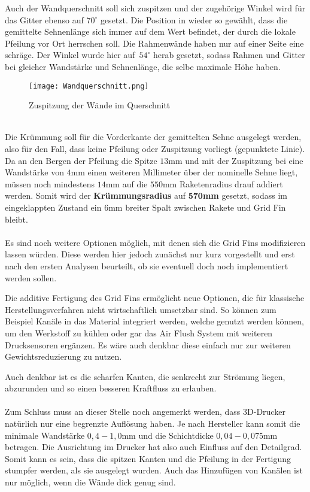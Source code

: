 Auch der Wandquerschnitt soll sich zuspitzen und der zugehörige Winkel wird für das Gitter ebenso auf $70^\circ$ gesetzt. Die Position in wieder so gewählt, dass die gemittelte Sehnenlänge sich immer auf dem Wert befindet, der durch die lokale Pfeilung vor Ort herrschen soll. Die Rahmenwände haben nur auf einer Seite eine schräge. Der Winkel wurde hier auf\ $54^\circ$ herab gesetzt, sodass Rahmen und Gitter bei gleicher Wandstärke und Sehnenlänge, die selbe maximale Höhe haben.
\begin{figure}
	\centering
	\texttt{[image: Wandquerschnitt.png]}
	\caption{Zuspitzung der Wände im Querschnitt}
\end{figure}\\
Die Krümmung soll für die Vorderkante der gemittelten Sehne ausgelegt werden, also für den Fall, dass keine Pfeilung oder Zuspitzung vorliegt (gepunktete Linie). Da an den Bergen der Pfeilung die Spitze $13$mm und mit der Zuspitzung bei eine Wandstärke von $4$mm einen weiteren Millimeter über der nominelle Sehne liegt, müssen noch mindestens $14$mm auf die $550$mm Raketenradius drauf addiert werden. Somit wird der \textbf{Krümmungsradius} auf $\mathbf{570}$\textbf{mm} gesetzt, sodass im eingeklappten Zustand ein $6$mm breiter Spalt zwischen Rakete und Grid Fin bleibt.
\\~\\
Es sind noch weitere Optionen möglich, mit denen sich die Grid Fins modifizieren lassen würden. Diese werden hier jedoch zunächst nur kurz vorgestellt und erst nach den ersten Analysen beurteilt, ob sie eventuell doch noch implementiert werden sollen.

Die additive Fertigung des Grid Fins ermöglicht neue Optionen, die für klassische Herstellungsverfahren nicht wirtschaftlich umsetzbar sind. So können zum Beispiel Kanäle in das Material integriert werden, welche genutzt werden können, um den Werkstoff zu kühlen oder gar das Air Flush System mit weiteren Drucksensoren ergänzen. Es wäre auch denkbar diese einfach nur zur weiteren Gewichtsreduzierung zu nutzen.

Auch denkbar ist es die scharfen Kanten, die senkrecht zur Strömung liegen, abzurunden und so einen besseren Kraftfluss zu erlauben.
\\~\\
Zum Schluss muss an dieser Stelle noch angemerkt werden, dass 3D-Drucker natürlich nur eine begrenzte Auflösung haben. Je nach Hersteller kann somit die minimale Wandstärke $0,4-1,0$mm \cite{eos, preise} und die Schichtdicke $0,04-0,075$mm \cite{preise} betragen. Die Ausrichtung im Drucker hat also auch Einfluss auf den Detailgrad. Somit kann es sein, dass die spitzen Kanten und die Pfeilung in der Fertigung stumpfer werden, als sie ausgelegt wurden. Auch das Hinzufügen von Kanälen ist nur möglich, wenn die Wände dick genug sind.
